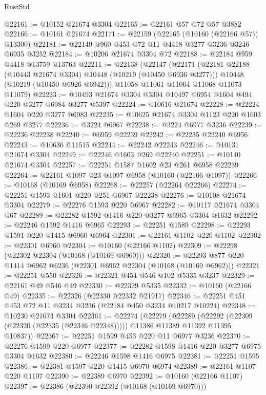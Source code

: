 \begin{lexlean}{RustStd}
\begin{coremodule}
@22161 := @10152 @21674 @3304
@22165 := @22161 @57 @72 @57 @3882
@22166 := @10161 @21674
@22171 := @22159 (@22165 (@10160 (@22166 @57)) @13300)
@22181 := @22149 @960 @453 @72 @11 @4418 @3277 @3236 @3246 @6935 @3252
@22184 := @10206 @21674 @3304 @72
@22188 := @22184 @959 @4418 @13759 @13763
@22211 := @22138
    (@22147
      (@22171
        (@22181 @22188 (@10443 @21674 @3304) @10448 (@10219 (@10450 @6936 @3277)))
        @10448
        (@10219 (@10450 @6926 @6942)))
      @11058
      @11061
      @11064
      @11068
      @11073
      @11079)
@22223 := @10493 @21674 @3304 @3304 @10497 @6954 @1604 @494 @220 @3277 @6984 @3277 @5397
@22224 := @10616 @21674
@22228 := @22224 @1604 @220 @3277 @6983
@22235 := @10625 @21674 @3304 @1123 @220 @1603 @269 @3277
@22236 := @3224 @6967
@22238 := @3224 @6977 @3236
@22239 := @22236 @22238
@22240 := @6959 @22239
@22242 := @22235 @22240 @6956
@22243 := @10636 @11515
@22244 := @22242 @22243
@22246 := @10131 @21674 @3304
@22249 := @22246 @1603 @269 @22240
@22251 := @10140 @21674 @3304
@22257 := @22251 @1587 @1602 @23 @261 @6958 @22239
@22264 := @22161 @1097 @23 @1097 @6958 (@10160 (@22166 @1097))
@22266 := @10168 (@10169 @6958)
@22268 := @22257 (@22264 @22266)
@22274 := @22251 @1593 @1601 @220 @251 @6967 @22238
@22276 := @10108 @21674 @3304
@22279 := @22276 @1593 @220 @6967
@22282 := @10117 @21674 @3304 @67
@22289 := @22282 @1592 @1416 @220 @3277 @6965 @3304 @1632
@22292 := @22246 @1592 @1416 @6965
@22293 := @22251 @1589
@22298 := @22293 @1591 @220 @1415 @6960 @6964
@22301 := @22161 @1102 @220 @1102
@22302 := @22301 @6960
@22304 := @10160 (@22166 @1102)
@22309 := @22298 (@22302 @22304 (@10168 (@10169 @6960)))
@22320 := @22293 @877 @220 @1414 @6962 @6236 (@22301 @6962 @22304 (@10168 (@10169 @6962)))
@22321 := @22251 @550
@22326 := @22321 @454 @546 @102 @5335 @3237
@22329 := @22161 @49 @546 @49
@22330 := @22329 @5335
@22332 := @10160 (@22166 @49)
@22335 := @22326 (@22330 @22332 @21917)
@22346 := @22251 @451 @453 @72 @11 @3234 @3236 (@22184 @450 @3234 @10217 @10224)
@22348 := @10230 @21674 @3304
@22361 := @22274
    (@22279
      (@22289
        (@22292 (@22309 (@22320 (@22335 (@22346 @22348)))))
        @11386
        @11389
        @11392
        @11395
        @10837))
@22367 := @22251 @1599 @453 @220 @11 @6977 @3236
@22370 := @22276 @1599 @220 @6977
@22377 := @22282 @1598 @1416 @220 @3277 @6975 @3304 @1632
@22380 := @22246 @1598 @1416 @6975
@22381 := @22251 @1595
@22386 := @22381 @1597 @220 @1415 @6970 @6974
@22389 := @22161 @1107 @220 @1107
@22390 := @22389 @6970
@22392 := @10160 (@22166 @1107)
@22397 := @22386 (@22390 @22392 (@10168 (@10169 @6970)))

\end{coremodule}
\end{lexlean}
